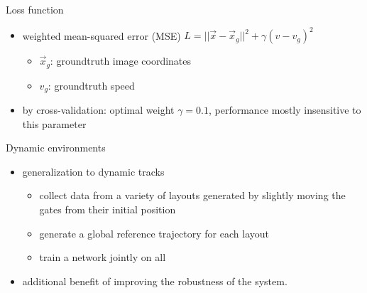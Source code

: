 Loss function
\begin{itemize}
    \item weighted mean-squared error (MSE) $L = ||\vec x - \vec x_g||^2 + \gamma (v-v_g)^2$
    \begin{itemize}
        \item $\vec x_g$: groundtruth image coordinates
        \item $v_g$: groundtruth speed
    \end{itemize}
    \item by cross-validation: optimal weight $\gamma = 0.1$, performance mostly insensitive to this parameter
\end{itemize}

Dynamic environments
\begin{itemize}
    \item generalization to dynamic tracks
    \begin{itemize}
        \item collect data from a variety of layouts generated by slightly moving the gates from their initial position
        \item generate a global reference trajectory for each layout
        \item train a network jointly on all
    \end{itemize}
    \item additional benefit of improving the robustness of the system.  
\end{itemize}